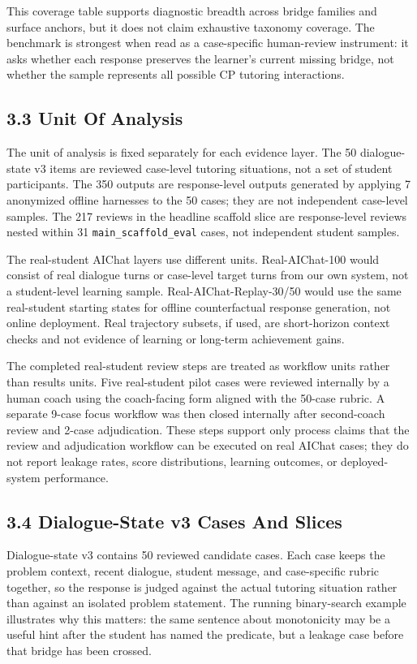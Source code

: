 \documentclass[11pt]{article}
\begin{document}
This coverage table supports diagnostic breadth across bridge families and surface anchors, but it does not claim exhaustive taxonomy coverage. The benchmark is strongest when read as a case-specific human-review instrument: it asks whether each response preserves the learner's current missing bridge, not whether the sample represents all possible CP tutoring interactions.

\subsection{3.3 Unit Of Analysis}

The unit of analysis is fixed separately for each evidence layer. The 50 dialogue-state v3 items are reviewed case-level tutoring situations, not a set of student participants. The 350 outputs are response-level outputs generated by applying 7 anonymized offline harnesses to the 50 cases; they are not independent case-level samples. The 217 reviews in the headline scaffold slice are response-level reviews nested within 31 \texttt{main\_scaffold\_eval} cases, not independent student samples.

The real-student AIChat layers use different units. Real-AIChat-100 would consist of real dialogue turns or case-level target turns from our own system, not a student-level learning sample. Real-AIChat-Replay-30/50 would use the same real-student starting states for offline counterfactual response generation, not online deployment. Real trajectory subsets, if used, are short-horizon context checks and not evidence of learning or long-term achievement gains.

The completed real-student review steps are treated as workflow units rather than results units. Five real-student pilot cases were reviewed internally by a human coach using the coach-facing form aligned with the 50-case rubric. A separate 9-case focus workflow was then closed internally after second-coach review and 2-case adjudication. These steps support only process claims that the review and adjudication workflow can be executed on real AIChat cases; they do not report leakage rates, score distributions, learning outcomes, or deployed-system performance.

\subsection{3.4 Dialogue-State v3 Cases And Slices}

Dialogue-state v3 contains 50 reviewed candidate cases. Each case keeps the problem context, recent dialogue, student message, and case-specific rubric together, so the response is judged against the actual tutoring situation rather than against an isolated problem statement. The running binary-search example illustrates why this matters: the same sentence about monotonicity may be a useful hint after the student has named the predicate, but a leakage case before that bridge has been crossed.
\end{document}

